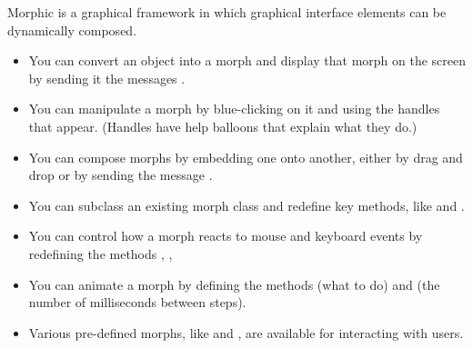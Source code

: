 \documentclass[a4paper,10pt,twoside]{book}
\begin{document}
Morphic is a graphical framework in which graphical interface elements can be dynamically composed.

\begin{itemize}
  \item You can convert an object into a morph and display that morph on the screen by sending it the messages .
  \item You can manipulate a morph by blue-clicking on it and using the handles that appear. (Handles have help balloons that explain what they do.)
  \item You can compose morphs by embedding one onto another, either by drag and drop or by sending the message .
  \item You can subclass an existing morph class and redefine key methods, like  and .
  \item You can control how a morph reacts to mouse and keyboard events by redefining the methods , , \etc
  \item You can animate a morph by defining the methods  (what to do) and  (the number of milliseconds between steps).
  \item Various pre-defined morphs, like  and , are available for interacting with users.
\end{itemize}

\ifx\wholebook\relax\else
\end{document}
